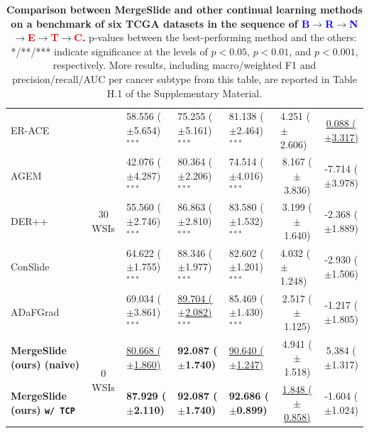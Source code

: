 \documentclass[10pt,twocolumn,letterpaper]{article}
\begin{document}
\begin{table}[]
{\begin{tabular}{l|c|lll|cc}
ER-ACE \cite{erace}  & \multirow{5}{*}{30 WSIs} & {58.556 ($\pm$5.654)}$^{***}$ & {75.255 ($\pm$5.161)}$^{***}$ & 81.138 ($\pm$2.464)$^{***}$ & \multicolumn{1}{l}{4.251 ($\pm$2.606)} &  \underline{0.088 ($\pm$3.317)} \\
AGEM \cite{agem} &  & {42.076 ($\pm$4.287)}$^{***}$ & {80.364 ($\pm$2.206)}$^{***}$ & 74.514 ($\pm$4.016)$^{***}$ & 8.167 ($\pm$3.836)  & -7.714 ($\pm$3.978) \\
DER++ \cite{derpp} &  & {55.560 ($\pm$2.746)}$^{***}$ & {86.863 ($\pm$2.810)}$^{***}$ & 83.580 ($\pm$1.532)$^{***}$ & 3.199 ($\pm$1.640) & -2.368 ($\pm$1.889) \\
ConSlide \cite{huang2023conslide}  &  & {64.622 ($\pm$1.755)}$^{***}$ & {88.346 ($\pm$1.977)}$^{***}$ & 82.602 ($\pm$1.201)$^{***}$ & \multicolumn{1}{l}{4.032 ($\pm$1.248)} & -2.930 ($\pm$1.506) \\
ADaFGrad \cite{adafgrad} &  & {69.034 ($\pm$3.861)}$^{***}$ & {\underline{89.704 ($\pm$2.082)}}$^{***}$ & 85.469 ($\pm$1.430)$^{***}$ & 2.517 ($\pm$1.125) & -1.217 ($\pm$1.805) \\ \midrule
\textbf{MergeSlide (ours) (naive)} & \multirow{2}{*}{0 WSIs} & {\underline{80.668 ($\pm$1.860)}} & {\textbf{92.087 ($\pm$1.740)}} & \underline{90.640 ($\pm$1.247)} & 4.941 ($\pm$1.518) & 5.384 ($\pm$1.317) \\ 
\textbf{MergeSlide (ours) \texttt{w/ TCP}} &  & {\textbf{87.929 ($\pm$2.110)}} & {\textbf{92.087 ($\pm$1.740)}} & \textbf{92.686 ($\pm$0.899)} & \underline{1.848 ($\pm$0.858)} & -1.604 ($\pm$1.024) \\
\bottomrule
\end{tabular}}
\caption{\textbf{Comparison between MergeSlide and other continual learning methods on a benchmark of six TCGA datasets in the sequence of \textcolor{blue}{B}$\rightarrow$\textcolor{blue}{R}$\rightarrow$\textcolor{blue}{N}$\rightarrow$\textcolor{red}{E}$\rightarrow$\textcolor{red}{T}$\rightarrow$\textcolor{red}{C}.} p-values between the best-performing method and the others: */**/*** indicate significance at the levels of $p < 0.05$, $p < 0.01$, and $p < 0.001$, respectively. {More results, including macro/weighted F1 and precision/recall/AUC per cancer subtype from this table, are reported in Table H.1 of the Supplementary Material}.}
\label{tab:main_results}
\end{table}
\end{document}
